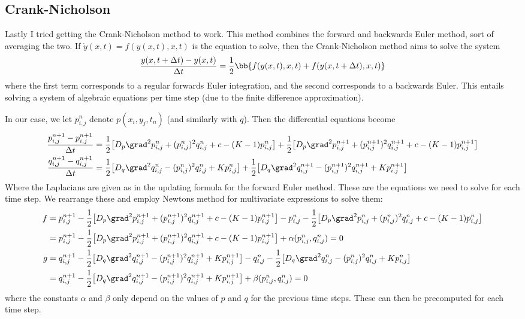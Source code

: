 \documentclass[a4paper,10pt]{article}
\begin{document}
	\subsection*{Crank-Nicholson}
	Lastly I tried getting the Crank-Nicholson method to work. This method combines the forward and backwards Euler method, sort of averaging the two. If $ \dot{y}(x,t) = f(y(x, t), x, t) $ is the equation to solve, then the Crank-Nicholson method aims to solve the system
	\begin{equation}
		\frac{y(x, t+\Delta t) - y(x, t)}{\Delta t}  = \frac{1}{2} \bb{f(y(x, t), x, t) + f(y(x, t+\Delta t), x, t)}
	\end{equation}
	where the first term corresponds to a regular forwards Euler integration, and the second corresponds to a backwards Euler. This entails solving a system of algebraic equations per time step (due to the finite difference approximation).

	In our case, we let $ p_{i,j}^n $ denote $ p(x_i, y_j, t_n) $ (and similarly with $ q $). Then the differential equations become
	\begin{align*}
		\frac{p_{i,j}^{n+1} - p_{i,j}^{n+1}}{\Delta t} &= \frac{1}{2} \big[D_p \grad^2 p_{i,j}^{n} + (p_{i,j}^{n})^2 q_{i,j}^{n} + c - (K-1) p_{i,j}^{n}\big] + \frac{1}{2} \big[D_p \grad^2 p_{i,j}^{n+1} + (p_{i,j}^{n+1})^2 q_{i,j}^{n+1} + c - (K-1) p_{i,j}^{n+1}\big] \\
		\frac{q_{i,j}^{n+1} - q_{i,j}^{n+1}}{\Delta t} &= \frac{1}{2} \big[D_q \grad^2 q_{i,j}^{n} - (p_{i,j}^{n})^2 q_{i,j}^{n} + K p_{i,j}^{n}\big] + \frac{1}{2} \big[D_q \grad^2 q_{i,j}^{n+1} - (p_{i,j}^{n+1})^2 q_{i,j}^{n+1} + K p_{i,j}^{n+1}\big]
	\end{align*}
	Where the Laplacians are given as in the updating formula for the forward Euler method. These are the equations we need to solve for each time step. We rearrange these and employ Newtons method for multivariate expressions to solve them:
	\begin{align*}
		f &= p_{i,j}^{n+1} -  \frac{1}{2} \big[D_p \grad^2 p_{i,j}^{n+1} + (p_{i,j}^{n+1})^2 q_{i,j}^{n+1} + c - (K-1) p_{i,j}^{n+1}\big] - p_{i,j}^{n} - \frac{1}{2} \big[D_p \grad^2 p_{i,j}^{n} + (p_{i,j}^{n})^2 q_{i,j}^{n} + c - (K-1) p_{i,j}^{n}\big] \\
		&= p_{i,j}^{n+1} -  \frac{1}{2} \big[D_p \grad^2 p_{i,j}^{n+1} + (p_{i,j}^{n+1})^2 q_{i,j}^{n+1} + c - (K-1) p_{i,j}^{n+1}\big] + \alpha(p_{i,j}^n, q_{i,j}^n) = 0 \\
		g &= q_{i,j}^{n+1} -  \frac{1}{2} \big[D_q \grad^2 q_{i,j}^{n+1} - (p_{i,j}^{n+1})^2 q_{i,j}^{n+1} + K p_{i,j}^{n+1}\big] - q_{i,j}^{n} - \frac{1}{2} \big[D_q \grad^2 q_{i,j}^{n} - (p_{i,j}^{n})^2 q_{i,j}^{n} + K p_{i,j}^{n}\big] \\
		&= q_{i,j}^{n+1} -  \frac{1}{2} \big[D_q \grad^2 q_{i,j}^{n+1} - (p_{i,j}^{n+1})^2 q_{i,j}^{n+1} + K p_{i,j}^{n+1}\big] + \beta(p_{i,j}^n, q_{i,j}^n) = 0
	\end{align*}
	where the constants $ \alpha $ and $ \beta $ only depend on the values of $ p $ and $ q $ for the previous time steps. These can then be precomputed for each time step. 
	
\end{document}
